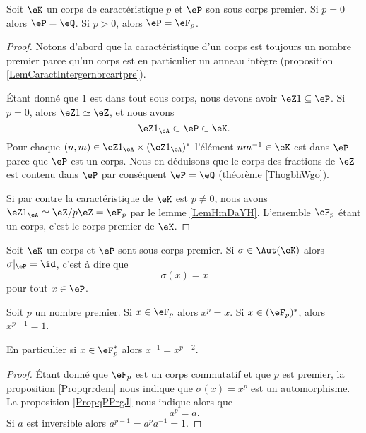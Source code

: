 \begin{proposition}
    Soit \( \eK\) un corps de caractéristique \( p\) et \( \eP\) son sous corps premier. Si \( p=0\) alors \( \eP=\eQ\). Si \( p>0\), alors \( \eP=\eF_p\).
\end{proposition}

\begin{proof}
    Notons d'abord que la caractéristique d'un corps est toujours un nombre premier parce qu'un corps est en particulier un anneau intègre (proposition \ref{LemCaractIntergernbrcartpre}).

    Étant donné que \( 1\) est dans tout sous corps, nous devons avoir \( \eZ 1\subseteq \eP\). Si \( p=0\), alors \( \eZ 1\simeq \eZ\), et nous avons
    \begin{equation}
        \eZ 1_{\eA}\subset \eP\subset \eK.
    \end{equation}
    Pour chaque \( (n,m)\in \eZ 1_{\eA}\times (\eZ 1_{\eA})^*\) l'élément \( nm^{-1}\in \eK\) est dans \( \eP\) parce que \( \eP\) est un corps. Nous en déduisons que le corps des fractions de \( \eZ\) est contenu dans \( \eP\) par conséquent \( \eP=\eQ\) (théorème \ref{ThogbhWgo}). 

    Si par contre la caractéristique de \( \eK\) est \( p\neq 0\), nous avons \( \eZ 1_{\eA}\simeq\eZ/p\eZ=\eF_p\) par le lemme \ref{LemHmDaYH}. L'ensemble \( \eF_p\) étant un corps, c'est le corps premier de \( \eK\).
\end{proof}

\begin{proposition}     \label{PropqPPrgJ}
    Soit \( \eK\) un corps et \( \eP\) sont sous corps premier. Si \( \sigma\in\Aut(\eK)\) alors \( \sigma|_{\eP}=\id\), c'est à dire que
    \begin{equation}
        \sigma(x)=x
    \end{equation}
    pour tout \( x\in \eP\).
\end{proposition}

\begin{theorem}       \label{ThoOPQOiO}
    Soit \( p\) un nombre premier. Si \( x\in \eF_p\) alors \( x^p=x\). Si \( x\in(\eF_p)^*\), alors \( x^{p-1}=1\).

    En particulier si \( x\in \eF_p^*\) alors \( x^{-1}=x^{p-2}\).
\end{theorem}

\begin{proof}
    Étant donné que \( \eF_p\) est un corps commutatif et que \( p\) est premier, la proposition \ref{Propqrrdem} nous indique que \( \sigma(x)=x^p\) est un automorphisme. La proposition \ref{PropqPPrgJ} nous indique alors que
    \begin{equation}
        a^p=a.
    \end{equation}
    Si \( a\) est inversible alors \( a^{p-1}=a^pa^{-1}=1\).
\end{proof}

